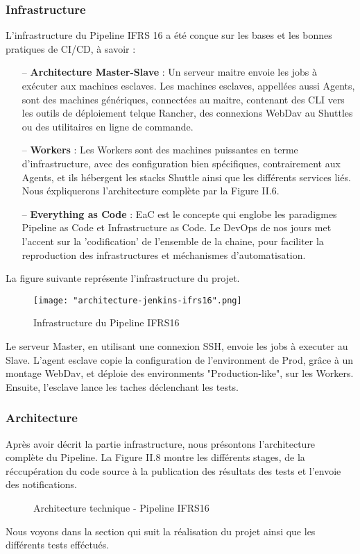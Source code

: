 \begin{spacing}{1.2}
\subsubsection{Infrastructure}
L'infrastructure du Pipeline IFRS 16 a été conçue sur les bases et les bonnes pratiques de CI/CD, à savoir : 
\begin{itemize}
\setlength\itemsep{0em}
\item[--] \textbf{Architecture Master-Slave} : Un serveur maitre envoie les jobs à exécuter aux machines esclaves. Les machines esclaves, appellées aussi Agents, sont des machines génériques, connectées au maitre, contenant des CLI vers les outils de déploiement telque Rancher, des connexions WebDav au Shuttles ou des utilitaires en ligne de commande. 
\item[--] \textbf{Workers} : Les Workers sont des machines puissantes en terme d'infrastructure, avec des configuration bien spécifiques, contrairement aux Agents, et ils hébergent les stacks Shuttle ainsi que les différents services liés. Nous éxpliquerons l'architecture complète par la Figure II.6. 
\item[--] \textbf{Everything as Code} : EaC est le concepte qui englobe les paradigmes Pipeline as Code et Infrastructure as Code. Le DevOps de nos jours met l'accent sur la 'codification' de l'ensemble de la chaine, pour faciliter la reproduction des infrastructures et méchanismes d'automatisation.
\end{itemize}
La figure suivante représente l'infrastructure du projet. 
\begin{figure}[!ht]\centering
\texttt{[image: "architecture-jenkins-ifrs16".png]}
\caption{Infrastructure du Pipeline IFRS16}
\label{fig:fig1}
\end{figure}
\FloatBarrier
\vspace{2mm}
Le serveur Master, en utilisant une connexion SSH, envoie les jobs à executer au Slave. L'agent esclave copie la configuration de l'environment de Prod, grâce à un montage WebDav, et déploie des environments "Production-like",  sur les Workers. Ensuite, l'esclave lance les taches déclenchant les tests. 
\subsubsection{Architecture} 
Après avoir décrit la partie infrastructure, nous présontons l'architecture complète du Pipeline. La Figure II.8 montre les différents stages, de la réccupération du code source à la publication des résultats des tests et l'envoie des notifications.
\begin{figure}[!ht]\centering
{}
\caption{Architecture technique - Pipeline IFRS16}
\label{fig:fig1}
\end{figure}
\FloatBarrier
Nous voyons dans la section qui suit la réalisation du projet ainsi que les différents tests efféctués.

\end{spacing}
